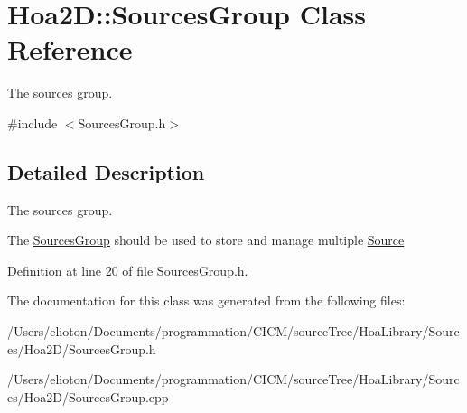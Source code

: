 \hypertarget{class_hoa2_d_1_1_sources_group}{\section{Hoa2\-D\-:\-:Sources\-Group Class Reference}
\label{class_hoa2_d_1_1_sources_group}
}


The sources group.  




{\ttfamily \#include $<$Sources\-Group.\-h$>$}



\subsection{Detailed Description}
The sources group. 

The \hyperlink{class_hoa2_d_1_1_sources_group}{Sources\-Group} should be used to store and manage multiple \hyperlink{class_hoa2_d_1_1_source}{Source} 

Definition at line 20 of file Sources\-Group.\-h.



The documentation for this class was generated from the following files\-:\begin{DoxyCompactItemize}
\item 
/\-Users/elioton/\-Documents/programmation/\-C\-I\-C\-M/source\-Tree/\-Hoa\-Library/\-Sources/\-Hoa2\-D/Sources\-Group.\-h\item 
/\-Users/elioton/\-Documents/programmation/\-C\-I\-C\-M/source\-Tree/\-Hoa\-Library/\-Sources/\-Hoa2\-D/Sources\-Group.\-cpp\end{DoxyCompactItemize}
